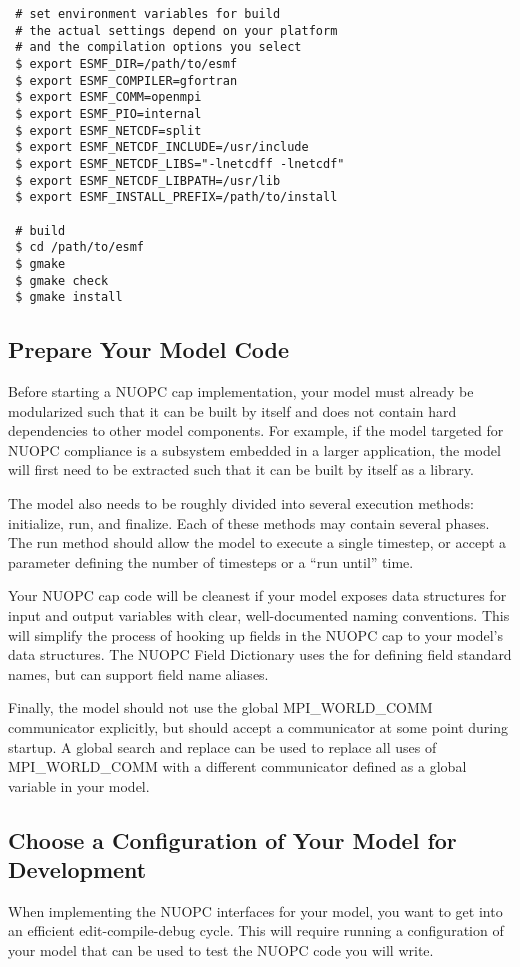 \begin{verbatim}
 # set environment variables for build
 # the actual settings depend on your platform
 # and the compilation options you select
 $ export ESMF_DIR=/path/to/esmf
 $ export ESMF_COMPILER=gfortran
 $ export ESMF_COMM=openmpi
 $ export ESMF_PIO=internal
 $ export ESMF_NETCDF=split
 $ export ESMF_NETCDF_INCLUDE=/usr/include
 $ export ESMF_NETCDF_LIBS="-lnetcdff -lnetcdf"
 $ export ESMF_NETCDF_LIBPATH=/usr/lib
 $ export ESMF_INSTALL_PREFIX=/path/to/install

 # build
 $ cd /path/to/esmf
 $ gmake
 $ gmake check
 $ gmake install
\end{verbatim}


\subsection{Prepare Your Model Code}
\label{sec:preparemodel}
Before starting a NUOPC cap implementation, your model must already
be modularized such that it can be built by itself and does not
contain hard dependencies to other model components.  For example,
if the model targeted for NUOPC compliance is a subsystem embedded
in a larger application, the model will first need to be extracted
such that it can be built by itself as a library.

The model also needs to be roughly divided into several execution
methods: initialize, run, and finalize.  Each of these methods may
contain several phases.  The run method should allow the model to
execute a single timestep, or accept a parameter defining the number of
timesteps or a ``run until'' time.

Your NUOPC cap code will be cleanest if your model exposes data
structures for input and output variables with clear, well-documented
naming conventions. This will simplify the process of hooking up fields
in the NUOPC cap to your model's data structures.  The NUOPC Field
Dictionary uses the 
for defining field standard names, but can support field name aliases.

Finally, the model should not use the global MPI\_WORLD\_COMM communicator
explicitly, but should accept a communicator at some point during
startup.  A global search and replace can be used to replace
all uses of MPI\_WORLD\_COMM with a different communicator defined
as a global variable in your model.


\subsection{Choose a Configuration of Your Model for Development}
\label{sec:chooseconfig}
When implementing the NUOPC interfaces for your model, you want to
get into an efficient edit-compile-debug cycle.  This will require
running a configuration of your model that can be used to test the
NUOPC code you will write.

